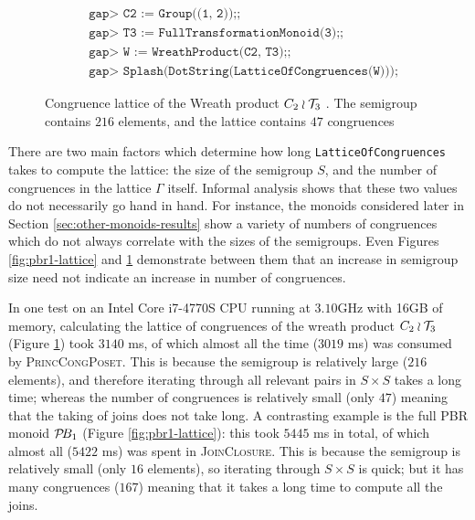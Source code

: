 \begin{figure}[h]
  \begin{align*}
    &\texttt{gap> C2 := Group((1, 2));;} \\
    &\texttt{gap> T3 := FullTransformationMonoid(3);;} \\
    &\texttt{gap> W := WreathProduct(C2, T3);;} \\
    &\texttt{gap> Splash(DotString(LatticeOfCongruences(W)));}
  \end{align*}
  \vspace{-1.0cm}
  \caption[Congruence lattice of the Wreath product $C_2 \wr \T_3$]
  {Congruence lattice of the Wreath product $C_2 \wr \T_3$
    \cite[\S10.1]{wreath}.  The semigroup contains $216$ elements, and the
    lattice contains $47$ congruences}
  \label{fig:c2-wr-t3-lattice}
\end{figure}

There are two main factors which determine how long
\texttt{LatticeOfCongruences} takes to compute the lattice: the size of the
semigroup $S$, and the number of congruences in the lattice $\Gamma$ itself.
Informal analysis shows that these two values do not necessarily go hand in
hand.  For instance, the monoids considered later in Section
\ref{sec:other-monoids-results} show a variety of numbers of congruences which
do not always correlate with the sizes of the semigroups.  Even Figures
\ref{fig:pbr1-lattice} and \ref{fig:c2-wr-t3-lattice} demonstrate between them
that an increase in semigroup size need not indicate an increase in number of
congruences.

In one test on an Intel Core i7-4770S CPU running at $3.10$GHz with 16GB of
memory, calculating the lattice of congruences of the wreath product
$C_2 \wr \T_3$ (Figure \ref{fig:c2-wr-t3-lattice}) took $3140$ ms, of which
almost all the time ($3019$ ms) was consumed by \textsc{PrincCongPoset}.  This
is because the semigroup is relatively large ($216$ elements), and therefore
iterating through all relevant pairs in $S \times S$ takes a long time; whereas
the number of congruences is relatively small (only $47$) meaning that the
taking of joins does not take long.  A contrasting example is the full PBR
monoid $\mathcal{P}\!B_1$ (Figure \ref{fig:pbr1-lattice}): this took $5445$ ms in total,
of which almost all ($5422$ ms) was spent in \textsc{JoinClosure}.  This is
because the semigroup is relatively small (only $16$ elements), so iterating
through $S \times S$ is quick; but it has many congruences ($167$) meaning that
it takes a long time to compute all the joins.

